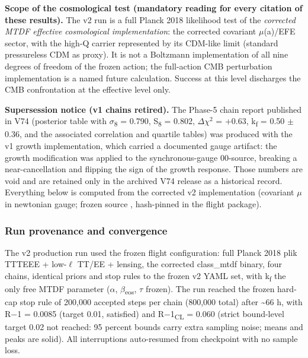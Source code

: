\documentclass[11pt,a4paper]{article}
\begin{document}
\begin{mdframed}[linecolor=accent,linewidth=0.5pt,backgroundcolor=callout-bg,leftline=true,rightline=true,topline=true,bottomline=true,innerleftmargin=8pt,innerrightmargin=8pt,innertopmargin=6pt,innerbottommargin=6pt]
\textbf{Scope of the cosmological test (mandatory reading for every citation of these results).} The v2 run is a full Planck 2018 likelihood test of the \emph{corrected MTDF effective cosmological implementation}: the corrected covariant $\mu$(a)/EFE sector, with the high-Q carrier represented by its CDM-like limit (standard pressureless CDM as proxy). It is not a Boltzmann implementation of all nine degrees of freedom of the frozen action; the full-action CMB perturbation implementation is a named future calculation. Success at this level discharges the CMB confrontation at the effective level only.
\end{mdframed}

\begin{mdframed}[linecolor=accent,linewidth=0.5pt,backgroundcolor=callout-bg,leftline=true,rightline=true,topline=true,bottomline=true,innerleftmargin=8pt,innerrightmargin=8pt,innertopmargin=6pt,innerbottommargin=6pt]
\textbf{Supersession notice (v1 chains retired).} The Phase-5 chain report published in V74 (posterior table with $\sigma$\textsubscript{8} = 0.790, S\textsubscript{8} = 0.802, $\Delta$$\chi$$^{2}$ = +0.63, k\textsubscript{f} = 0.50 $\pm$ 0.36, and the associated correlation and quartile tables) was produced with the v1 growth implementation, which carried a documented gauge artifact: the growth modification was applied to the synchronous-gauge 00-source, breaking a near-cancellation and flipping the sign of the growth response. Those numbers are void and are retained only in the archived V74 release as a historical record. Everything below is computed from the corrected v2 implementation (covariant $\mu$ in newtonian gauge; frozen source \texttt{{\small\protect{}}}, hash-pinned in the flight package).
\end{mdframed}

\subsubsection{Run provenance and convergence}
The v2 production run used the frozen flight configuration: full Planck 2018 plik TTTEEE + low-$\ell$ TT/EE + lensing, the corrected class\_\allowbreak{}mtdf binary, four chains, identical priors and stop rules to the frozen v2 YAML set, with k\textsubscript{f} the only free MTDF parameter ($\alpha$, $\beta$\textsubscript{eos}, $\tau$ frozen). The run reached the frozen hard-cap stop rule of 200,000 accepted steps per chain (800,000 total) after \~{}66 h, with R$-$1 = 0.0085 (target 0.01, satisfied) and R$-$1\textsubscript{CL} = 0.060 (strict bound-level target 0.02 not reached: 95 percent bounds carry extra sampling noise; means and peaks are solid). All interruptions auto-resumed from checkpoint with no sample loss.
\end{document}

